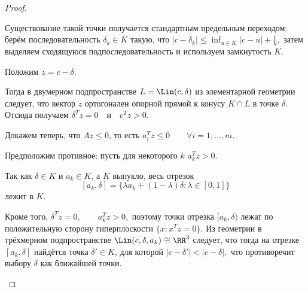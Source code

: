 \begin{proof}
\begin{figure}[h]
\end{figure}

	Существование такой точки получается стандартным предельным переходом: берём последовательность $\delta_k \in K$ такую, что $|c-\delta_k| \le \inf_{u \in K} |c-u| + \frac1k,$ затем выделяем сходящуюся подпоследовательность и используем замкнутость $K$.
	
	Положим $z = c - \delta.$
	
	Тогда в двумерном подпространстве $L = \Lin(c,\delta)$ из элементарной геометрии следует, что вектор $z$ ортогонален опорной прямой к конусу $K \cap L$ в точке $\delta$. Отсюда получаем $\delta^T z = 0 \quad \text{и} \quad c^T z > 0.$
	
	Докажем теперь, что $Az \le 0$, то есть $a_i^T z \le 0 \qquad \forall i=1,\dots,m.$
	
	Предположим противное: пусть для некоторого $k$ $a_k^T z > 0.$

	Так как $\delta \in K$ и $a_k \in K$, а $K$ выпукло, весь отрезок
	\[
	[a_k,\delta] = \{\lambda a_k + (1-\lambda)\delta : \lambda \in [0,1]\}
	\]
	лежит в $K$.
	
	Кроме того, $\delta^T z = 0, \qquad a_k^T z > 0,$ поэтому точки отрезка $[a_k,\delta)$ лежат по положительную сторону гиперплоскости $\{x : x^T z = 0\}.$
	Из геометрии в трёхмерном подпространстве $\Lin(c,\delta,a_k) \cong \RR^3$
	следует, что тогда на отрезке $[a_k,\delta]$ найдётся точка $\delta' \in K$, для которой $|c-\delta'| < |c-\delta|,$ что противоречит выбору $\delta$ как ближайшей точки.
	
\begin{figure}[h]\centering
\end{figure}
\end{proof}

